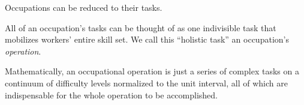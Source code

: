 \documentclass[hidelinks, nonatbib]{elsarticle}
\begin{document}
\label{ora}
\begin{axiom}
    Occupations can be reduced to their tasks.
\end{axiom}
\begin{axiom}
    \label{woca}
    All of an occupation's tasks can be thought of as one indivisible task that mobilizes workers' entire skill set. We call this ``holistic task'' an occupation's \textit{operation}.

    Mathematically, an occupational operation is just a series of complex tasks on a continuum of difficulty levels normalized to the unit interval, all of which are indispensable for the whole operation to be accomplished.
    

\end{axiom}
\end{document}
